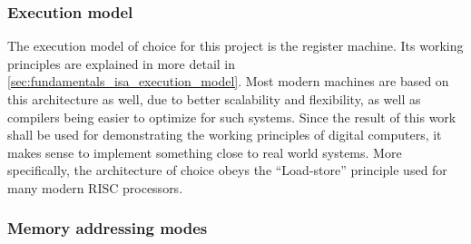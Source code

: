 \subsubsection{Execution model}

The execution model of choice for this project is the register machine. Its working principles are explained in more detail in \autoref{sec:fundamentals_isa_execution_model}. Most modern machines are based on this architecture as well, due to better scalability and flexibility, as well as compilers being easier to optimize for such systems. Since the result of this work shall be used for demonstrating the working principles of digital computers, it makes sense to implement something close to real world systems. More specifically, the architecture of choice obeys the ``Load-store'' principle used for many modern RISC processors.

\subsubsection{Memory addressing modes}

